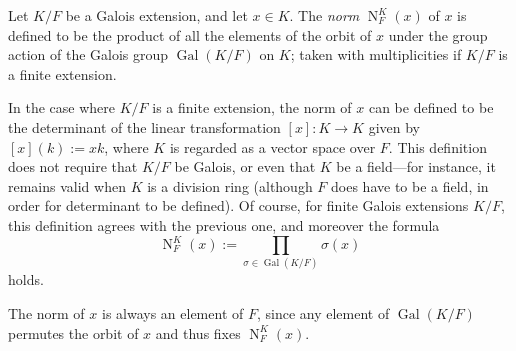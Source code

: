\documentclass{article}
\begin{document}
Let $K/F$ be a Galois extension, and let $x \in K$. The {\em norm} $\operatorname{N}_F^K(x)$ of $x$ is defined to be the product of all the elements of the orbit of $x$ under the group action of the Galois group $\operatorname{Gal}(K/F)$ on $K$; taken with multiplicities if $K/F$ is a finite extension.

In the case where $K/F$ is a finite extension, the norm of $x$ can be defined to be the determinant of the linear transformation $[x]: K \to K$ given by $[x](k) := xk$, where $K$ is regarded as a vector space over $F$. This definition does not require that $K/F$ be Galois, or even that $K$ be a field---for instance, it remains valid when $K$ is a division ring (although $F$ does have to be a field, in order for determinant to be defined). Of course, for finite Galois extensions $K/F$, this definition agrees with the previous one, and moreover the formula
$$
\operatorname{N}_F^K(x) := \prod_{\sigma \in \operatorname{Gal}(K/F)} \sigma(x)
$$
holds.

The norm of $x$ is always an element of $F$, since any element of $\operatorname{Gal}(K/F)$ permutes the orbit of $x$ and thus fixes $\operatorname{N}_F^K(x)$.
\end{document}
